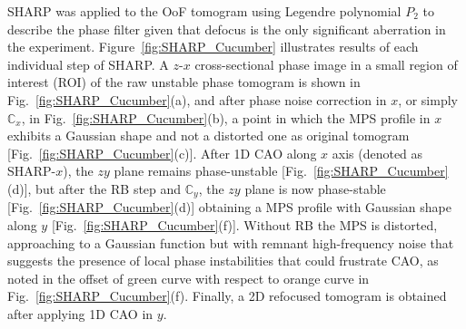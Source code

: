 SHARP was applied to the OoF tomogram using Legendre polynomial $P_2$ to describe the phase filter given that defocus is the only significant aberration in the experiment. Figure~\ref{fig:SHARP_Cucumber} illustrates results of each individual step of SHARP. A $z$-$x$ cross-sectional phase image in a small region of interest (ROI) of the raw unstable phase tomogram is shown in Fig.~\ref{fig:SHARP_Cucumber}(a), and after phase noise correction in $x$, or simply $\mathbb{C}_x$, in Fig.~\ref{fig:SHARP_Cucumber}(b), a point in which the MPS profile in $x$ exhibits a Gaussian shape and not a distorted one as original tomogram [Fig.~\ref{fig:SHARP_Cucumber}(c)]. After 1D CAO along $x$ axis (denoted as SHARP-$x$), the $zy$ plane remains phase-unstable [Fig.~\ref{fig:SHARP_Cucumber}(d)], but after the RB step and $\mathbb{C}_y$, the $zy$ plane is now phase-stable [Fig.~\ref{fig:SHARP_Cucumber}(d)] obtaining a MPS profile with Gaussian shape along $y$ [Fig.~\ref{fig:SHARP_Cucumber}(f)]. Without RB the MPS is distorted, approaching to a Gaussian function but with remnant high-frequency noise that suggests the presence of local phase instabilities that could frustrate CAO, as noted in the offset of green curve with respect to orange curve in Fig.~\ref{fig:SHARP_Cucumber}(f). Finally, a 2D refocused tomogram is obtained after applying 1D CAO in $y$.

